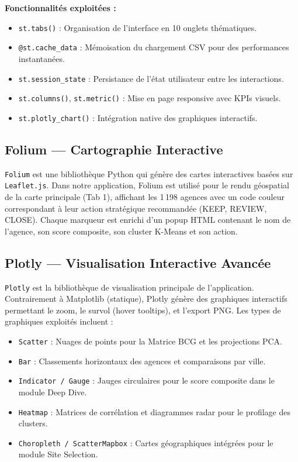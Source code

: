 \documentclass[11pt,a4paper,twoside]{report}
\begin{document}
\textbf{Fonctionnalités exploitées :}
\begin{itemize}
    \item \texttt{st.tabs()} : Organisation de l'interface en 10 onglets thématiques.
    \item \texttt{@st.cache\_data} : Mémoisation du chargement CSV pour des performances instantanées.
    \item \texttt{st.session\_state} : Persistance de l'état utilisateur entre les interactions.
    \item \texttt{st.columns()}, \texttt{st.metric()} : Mise en page responsive avec KPIs visuels.
    \item \texttt{st.plotly\_chart()} : Intégration native des graphiques interactifs.
\end{itemize}

\subsection{Folium — Cartographie Interactive}

\texttt{Folium} \cite{folium} est une bibliothèque Python qui génère des cartes interactives basées sur \texttt{Leaflet.js}. Dans notre application, Folium est utilisé pour le rendu géospatial de la carte principale (Tab 1), affichant les 1\,198 agences avec un code couleur correspondant à leur action stratégique recommandée (KEEP, REVIEW, CLOSE). Chaque marqueur est enrichi d'un popup HTML contenant le nom de l'agence, son score composite, son cluster K-Means et son action.

\subsection{Plotly — Visualisation Interactive Avancée}

\texttt{Plotly} \cite{plotly} est la bibliothèque de visualisation principale de l'application. Contrairement à Matplotlib (statique), Plotly génère des graphiques interactifs permettant le zoom, le survol (hover tooltips), et l'export PNG. Les types de graphiques exploités incluent :
\begin{itemize}
    \item \texttt{Scatter} : Nuages de points pour la Matrice BCG et les projections PCA.
    \item \texttt{Bar} : Classements horizontaux des agences et comparaisons par ville.
    \item \texttt{Indicator / Gauge} : Jauges circulaires pour le score composite dans le module Deep Dive.
    \item \texttt{Heatmap} : Matrices de corrélation et diagrammes radar pour le profilage des clusters.
    \item \texttt{Choropleth / ScatterMapbox} : Cartes géographiques intégrées pour le module Site Selection.
\end{itemize}
\end{document}
